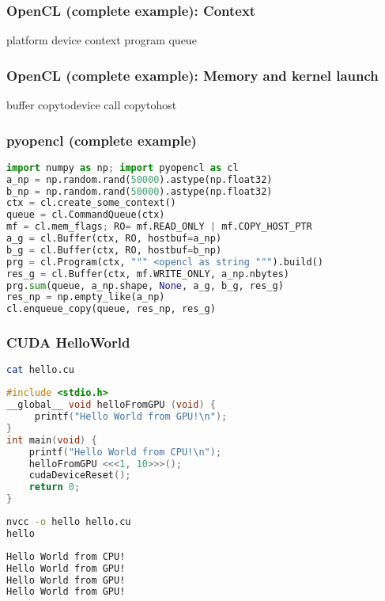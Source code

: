 \documentclass{beamer}
\begin{document}
\begin{frame}
\frametitle{OpenCL (complete example): Context}
platform
device
context
program
queue
\end{frame}

\begin{frame}
\frametitle{OpenCL  (complete example): Memory and kernel launch}
buffer
copytodevice
call
copytohost
\end{frame}

\begin{frame}[fragile]
\frametitle{pyopencl (complete example)}
\footnotesize
\begin{lstlisting}[language=python,basicstyle=\ttfamily,keywordstyle=\color{red}]
import numpy as np; import pyopencl as cl
a_np = np.random.rand(50000).astype(np.float32)
b_np = np.random.rand(50000).astype(np.float32)
ctx = cl.create_some_context()
queue = cl.CommandQueue(ctx)
mf = cl.mem_flags; RO= mf.READ_ONLY | mf.COPY_HOST_PTR
a_g = cl.Buffer(ctx, RO, hostbuf=a_np)
b_g = cl.Buffer(ctx, RO, hostbuf=b_np)
prg = cl.Program(ctx, """ <opencl as string """).build()
res_g = cl.Buffer(ctx, mf.WRITE_ONLY, a_np.nbytes)
prg.sum(queue, a_np.shape, None, a_g, b_g, res_g)
res_np = np.empty_like(a_np)
cl.enqueue_copy(queue, res_np, res_g)
\end{lstlisting}
\end{frame}

\begin{frame}[fragile]

\frametitle{CUDA  HelloWorld}
\footnotesize

\begin{lstlisting}[language=bash,basicstyle=\ttfamily,keywordstyle=\color{red}]
cat hello.cu
\end{lstlisting}
\begin{lstlisting}[language=c++,basicstyle=\ttfamily,keywordstyle=\color{red}]
#include <stdio.h>
__global__ void helloFromGPU (void) { 
     printf("Hello World from GPU!\n");
}
int main(void) {
    printf("Hello World from CPU!\n");
    helloFromGPU <<<1, 10>>>();
    cudaDeviceReset();
    return 0;
}
\end{lstlisting}
\begin{lstlisting}[language=bash,basicstyle=\ttfamily,keywordstyle=\color{red}]
nvcc -o hello hello.cu
hello
\end{lstlisting}
\begin{lstlisting}[language=bash,basicstyle=\ttfamily,keywordstyle=\color{red}]
Hello World from CPU!
Hello World from GPU!
Hello World from GPU!
Hello World from GPU!
\end{lstlisting}
\end{frame}
\end{document}

